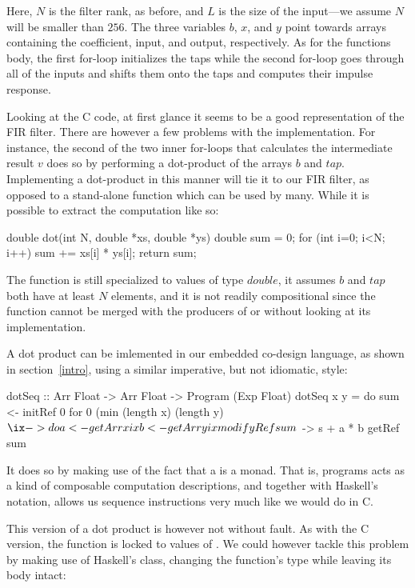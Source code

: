 \documentclass[../main.tex]{subfiles}
\begin{document}
\noindent Here, $N$ is the filter rank, as before, and $L$ is the size of the input---we assume $N$ will be smaller than $256$. The three variables $b$, $x$, and $y$ point towards arrays containing the coefficient, input, and output, respectively. As for the functions body, the first for-loop initializes the taps while the second for-loop goes through all of the inputs and shifts them onto the taps and computes their impulse response.

Looking at the C code, at first glance it seems to be a good representation of the FIR filter. There are however a few problems with the implementation. For instance, the second of the two inner for-loops that calculates the intermediate result $v$ does so by performing a dot-product of the arrays $b$ and $tap$. Implementing a dot-product in this manner will tie it to our FIR filter, as opposed to a stand-alone function which can be used by many. While it is possible to extract the computation like so:

\begin{code}
double dot(int N, double *xs, double *ys)
{
  double sum = 0;
  for (int i=0; i<N; i++) sum += xs[i] * ys[i];
  return sum;
}
\end{code}

\noindent The function is still specialized to values of type $double$, it assumes $b$ and $tap$ both have at least $N$ elements, and it is not readily compositional since the function cannot be merged with the producers of  or  without looking at its implementation.

A dot product can be imlemented in our embedded co-design language, as shown in section~\ref{intro}, using a similar imperative, but not idiomatic, style:

\begin{code}
dotSeq :: Arr Float -> Arr Float -> Program (Exp Float)
dotSeq x y = do
  sum <- initRef 0
  for 0 (min (length x) (length y) $ \ix -> do
    a <- getArr x ix
    b <- getArr y ix
    modifyRef sum $ \s -> s + a * b
  getRef sum
\end{code}

\noindent It does so by making use of the fact that a  is a monad. That is, programs acts as a kind of composable computation descriptions, and together with Haskell's  notation, allows us sequence instructions very much like we would do in C.

This version of a dot product is however not without fault. As with the C version, the function is locked to values of . We could however tackle this problem by making use of Haskell's  class, changing the function's type while leaving its body intact:
\end{document}
